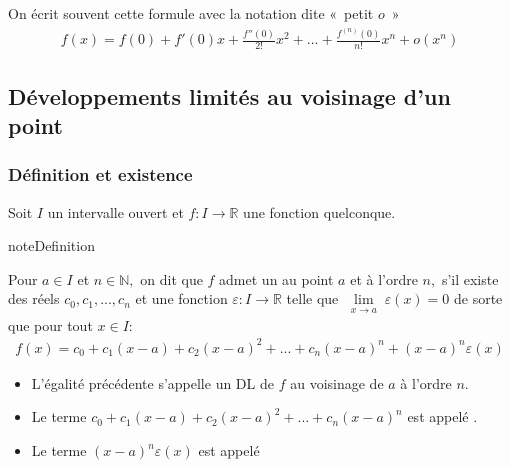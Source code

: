 \documentclass[letterpaper,10pt,french]{jupyterBook}
\begin{document}
\sphinxAtStartPar
On écrit souvent cette formule avec la notation dite « petit \(o\) »
\begin{equation*}
\begin{split}
f(x)=f(0)+f'(0)x+\frac{f''(0)}{2!}x^2+...+\frac{f^{(n)}(0)}{n!}x^n+o(x^n)
\end{split}
\end{equation*}

\subsection{Développements limités au voisinage d’un point}
\label{\detokenize{dl:developpements-limites-au-voisinage-d-un-point}}

\subsubsection{Définition et existence}
\label{\detokenize{dl:definition-et-existence}}
\sphinxAtStartPar
Soit \(I\) un intervalle ouvert et \(f :I\rightarrow\mathbb{R}\) une fonction quelconque.

\begin{sphinxadmonition}{note}{Definition}

\sphinxAtStartPar
Pour \(a\in  I\) et \(n\in\mathbb{N},\) on dit que \(f\) admet un  au point \(a\) et à l’ordre \(n,\) s’il existe des
réels \(c_0,c_1,...,c_n\) et une fonction \(\varepsilon:I\rightarrow\mathbb{R}\) telle que \(\lim\limits_{\substack{x \rightarrow a}}\varepsilon(x)=0\) de sorte que pour tout \(x\in I:\)
\begin{equation*}
\begin{split}
f(x)=c_0+c_1(x-a)+c_2(x-a)^2+...+c_n(x-a)^n+(x-a)^n \varepsilon(x)
\end{split}
\end{equation*}\begin{itemize}
\item {} 
\sphinxAtStartPar
L’égalité précédente s’appelle un DL de \(f\) au voisinage de \(a\) à l’ordre \(n.\)

\item {} 
\sphinxAtStartPar
Le terme \(c_0+c_1(x-a)+c_2(x-a)^2+...+c_n(x-a)^n\) est appelé .

\item {} 
\sphinxAtStartPar
Le terme  \((x-a)^n \varepsilon(x)\) est appelé 

\end{itemize}
\end{sphinxadmonition}
\end{document}
